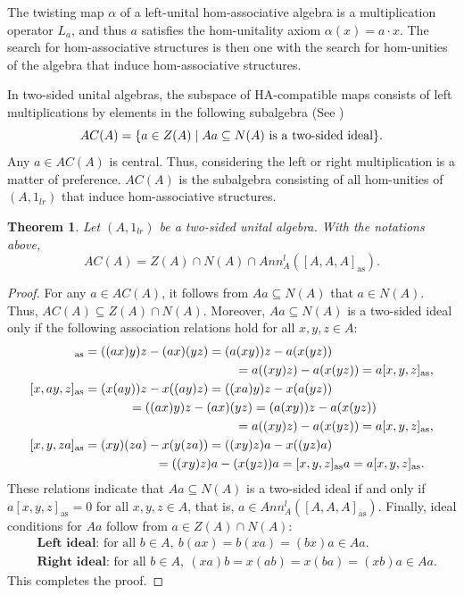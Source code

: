 \documentclass[12pt]{article}
\newtheorem{theorem}{Theorem}
\begin{document}
		The twisting map $\alpha$ of a left-unital hom-associative algebra is a multiplication operator $L_a$, and thus $a$ satisfies the hom-unitality axiom $\alpha(x)=a\cdot x$. The search for hom-associative structures is then one with the search for hom-unities of the algebra that induce hom-associative structures.
		
		In two-sided unital algebras, the subspace of HA-compatible maps consists of left multiplications by elements in the following subalgebra (See \cite[Proposition 1.1]{FreGohr:UnitCond})
		\begin{equation*}
			AC(A)=\{a\in Z(A)\mid Aa\subseteq N(A) \textnormal{ is a two-sided ideal}\}.
		\end{equation*}
		Any $a\in AC(A)$ is central. Thus, considering the left or right multiplication is a matter of preference. $AC(A)$ is the subalgebra consisting of all hom-unities of $(A,1_{lr})$ that induce hom-associative structures.
		\begin{theorem}\label{thm:AC_two_sided_unital}
			Let $(A,1_{lr})$ be a two-sided unital algebra. With the notations above,
			\begin{equation}\label{eqn:ACA_formula}
				AC(A)=Z(A)\cap N(A)\cap Ann_A^l([A,A,A]_{\mathrm{as}}).
			\end{equation}
		\end{theorem}
		\begin{proof}
			For any $a\in AC(A)$, it follows from $Aa\subseteq N(A)$ that $a\in N(A)$. Thus, $AC(A)\subseteq Z(A)\cap N(A)$. Moreover, $Aa\subseteq N(A)$ is a two-sided ideal only if the following association relations hold for all $x,y,z\in A$:
			\begin{align*}
				[ax,y,z]_{\mathrm{as}}&=((ax)y)z-(ax)(yz)=(a(xy))z-a(x(yz))\\
				&\hspace{4.25cm}=a((xy)z)-a(x(yz))=a[x,y,z]_{\mathrm{as}},\\
				[x,ay,z]_{\mathrm{as}}&=(x(ay))z-x((ay)z)=((xa)y)z-x(a(yz))\\
				&\hspace{1.25cm}=((ax)y)z-(ax)(yz)=(a(xy))z-a(x(yz))\\
				&\hspace{4.25cm}=a((xy)z)-a(x(yz))=a[x,y,z]_{\mathrm{as}},\\
				[x,y,za]_{\mathrm{as}}&=(xy)(za)-x(y(za))=((xy)z)a-x((yz)a)\\
				&\hspace{2cm}=((xy)z)a-(x(yz))a=[x,y,z]_{\mathrm{as}}a=a[x,y,z]_{\mathrm{as}}.
			\end{align*}
			These relations indicate that $Aa\subseteq N(A)$ is a two-sided ideal if and only if $a[x,y,z]_{\mathrm{as}}=0$ for all $x,y,z\in A$, that is, $a\in Ann_{A}^l([A,A,A]_{\mathrm{as}})$. Finally, ideal conditions for $Aa$ follow from $a\in Z(A)\cap N(A)$:
			\begin{align*}
				&\textbf{Left ideal: }\text{for all }  b\in A,\ b(ax)=b(xa)=(bx)a\in Aa. \\
				&\textbf{Right ideal: }\text{for all } b\in A,\ (xa)b=x(ab)=x(ba)=(xb)a\in Aa.
			\end{align*}
			This completes the proof.
		\end{proof}
\end{document}
